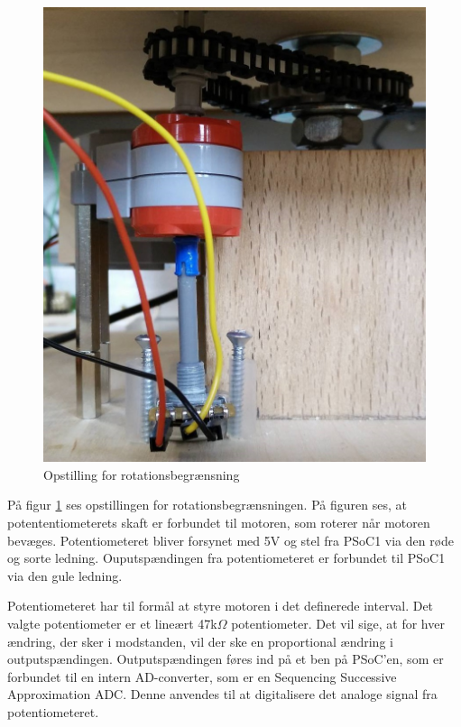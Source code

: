 \begin{figure}[H]
	\centering
	\includegraphics[scale=0.3]{Afsnit/DesignOgImplementering/images/potentiometerADC}
	\caption{Opstilling for rotationsbegrænsning}
	\label{fig:opstillingADC}
\end{figure}

\noindent På figur \ref{fig:opstillingADC} ses opstillingen for rotationsbegrænsningen. På figuren ses, at potententiometerets skaft er forbundet til motoren, som roterer når motoren bevæges. Potentiometeret bliver forsynet med 5V og stel fra PSoC1 via den røde og sorte ledning. Ouputspændingen fra potentiometeret er forbundet til PSoC1 via den gule ledning.  \newline

Potentiometeret har til formål at styre motoren i det definerede interval. Det valgte potentiometer er et lineært 47k\(\Omega\) potentiometer. Det vil sige, at for hver ændring, der sker i modstanden, vil der ske en proportional ændring i outputspændingen. Outputspændingen føres ind på et ben på PSoC'en, som er forbundet til en intern AD-converter, som er en Sequencing Successive Approximation ADC. Denne anvendes til at digitalisere det analoge signal fra potentiometeret.


